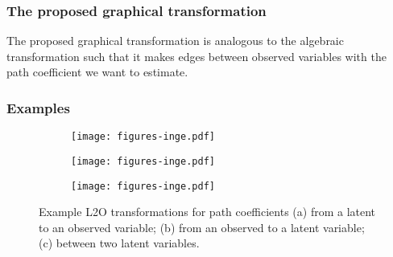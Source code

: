 \documentclass{beamer}
\begin{document}
\begin{frame}
	\frametitle{The proposed graphical transformation}
	The proposed graphical transformation is analogous to the algebraic 
	transformation such that it makes edges between observed variables
	with the path coefficient we want to estimate.
\end{frame}

\begin{frame}
	\frametitle{Examples}
		\begin{figure}[t]
		    \centering
		    \begin{subfigure}[b]{.33\linewidth}
		    	\centering
			\texttt{[image: figures-inge.pdf]}
		        \caption{}
			\label{fig:l2o_parent}
		    \end{subfigure}%
		    \begin{subfigure}[b]{.33\linewidth}
		    	\centering
			\texttt{[image: figures-inge.pdf]}
		        \caption{}
			\label{fig:l2o_child}
		    \end{subfigure}%
		    \begin{subfigure}[b]{.33\linewidth}
		    	\centering
			\texttt{[image: figures-inge.pdf]}
		        \caption{}
			\label{fig:l2o_both}
		    \end{subfigure}
			\caption{Example L2O transformations for path
			coefficients (a) from a latent to an observed variable;
			(b) from an observed to a latent variable; (c) between
			two latent variables.}
		\end{figure}
\end{frame}
\end{document}
